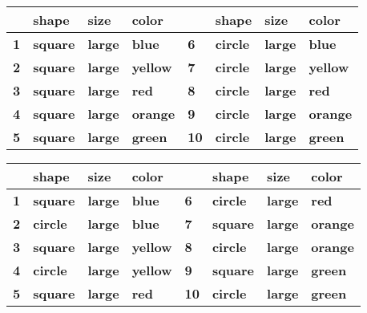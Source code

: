 \begin{table}[!ht]
 {
 \centering
 \begin{tabular}{l l l l l l l l}\hline
 \textbf{} & \textbf{shape} & \textbf{size} & \textbf{color}   & \textbf{} & \textbf{shape} & \textbf{size} & \textbf{color}\\\hline
 \textbf{1} & \textbf{square} & \textbf{large} & \textbf{blue}   & \textbf{6} & \textbf{circle} & \textbf{large} & \textbf{blue}\\
 \textbf{2} & \textbf{square} & \textbf{large} & \textbf{yellow} & \textbf{7} & \textbf{circle} & \textbf{large} & \textbf{yellow}\\
 \textbf{3} & \textbf{square} & \textbf{large} & \textbf{red}    & \textbf{8} & \textbf{circle} & \textbf{large} & \textbf{red}\\
 \textbf{4} & \textbf{square} & \textbf{large} & \textbf{orange} & \textbf{9} & \textbf{circle} & \textbf{large} & \textbf{orange}\\
 \textbf{5} & \textbf{square} & \textbf{large} & \textbf{green}  & \textbf{10} & \textbf{circle} & \textbf{large} & \textbf{green}\\
 \hline
 \end{tabular}
 \label{tab:exp1seq1}}
 \end{table}
 
\begin{table}[!ht]
 {
 \centering
 \begin{tabular}{l l l l l l l l}\hline
 \textbf{} & \textbf{shape} & \textbf{size} & \textbf{color}   & \textbf{} & \textbf{shape} & \textbf{size} & \textbf{color}\\\hline
 \textbf{1} & \textbf{square} & \textbf{large} & \textbf{blue}   & \textbf{6}& \textbf{circle} & \textbf{large} & \textbf{red}\\
 \textbf{2} & \textbf{circle} & \textbf{large} & \textbf{blue}   & \textbf{7}& \textbf{square} & \textbf{large} & \textbf{orange} \\
 \textbf{3} & \textbf{square} & \textbf{large} & \textbf{yellow} & \textbf{8}& \textbf{circle} & \textbf{large} & \textbf{orange} \\
 \textbf{4} & \textbf{circle} & \textbf{large} & \textbf{yellow} & \textbf{9}& \textbf{square} & \textbf{large} & \textbf{green} \\
 \textbf{5} &\textbf{square} & \textbf{large}  & \textbf{red}    &\textbf{10}& \textbf{circle} & \textbf{large} & \textbf{green}\\
 \hline
 \end{tabular}
 \label{tab:exp1seq2}}
 \end{table}
 

